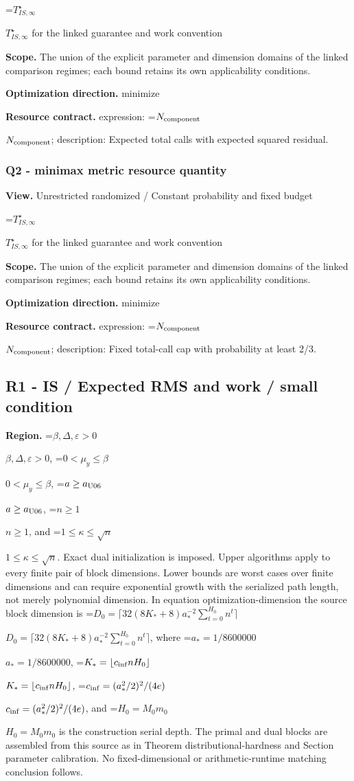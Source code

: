 \documentclass[10pt,a4paper]{article}
\newcommand{\AtlasMath}[1]{\par\begingroup\centering\setbox0=\hbox{$\displaystyle #1$}\ifdim\wd0>1.4\linewidth\typeout{ATLAS WIDE FORMULA: \the\wd0}\fi\ifdim\wd0>\linewidth\resizebox{\linewidth}{!}{\box0}\else\box0\fi\par\endgroup}
\newcommand{\AtlasInlineMath}[1]{\begingroup\setbox0=\hbox{$#1$}\ifdim\wd0>.4\linewidth\endgroup\AtlasMath{#1}\else\endgroup$#1$\fi}
\begin{document}
\AtlasInlineMath{T^\star_{IS,\infty}} for the linked guarantee and work convention



\textbf{Scope.} The union of the explicit parameter and dimension domains of the linked comparison regimes; each bound retains its own applicability conditions.



\textbf{Optimization direction.} minimize



\textbf{Resource contract.} expression: \AtlasInlineMath{N_{\rm component}}; description: Expected total calls with expected squared residual.



\subsubsection{Q2 - minimax metric resource quantity}


\textbf{View.} Unrestricted randomized / Constant probability and fixed budget



\AtlasInlineMath{T^\star_{IS,\infty}} for the linked guarantee and work convention



\textbf{Scope.} The union of the explicit parameter and dimension domains of the linked comparison regimes; each bound retains its own applicability conditions.



\textbf{Optimization direction.} minimize



\textbf{Resource contract.} expression: \AtlasInlineMath{N_{\rm component}}; description: Fixed total-call cap with probability at least 2/3.



\subsection{R1 - IS / Expected RMS and work / small condition}


\textbf{Region.} \AtlasInlineMath{\beta,\Delta,\varepsilon>0}, \AtlasInlineMath{0<\mu_y\le\beta}, \AtlasInlineMath{a\ge a_{\rm U06}}, \AtlasInlineMath{n\ge1}, and \AtlasInlineMath{1\le\kappa\le\sqrt n}. Exact dual initialization is imposed. Upper algorithms apply to every finite pair of block dimensions. Lower bounds are worst cases over finite dimensions and can require exponential growth with the serialized path length, not merely polynomial dimension. In equation optimization-dimension the source block dimension is \AtlasInlineMath{D_0=\lceil32(8K_*+8)a_*^{-2}\sum_{t=0}^{H_0}n^t\rceil}, where \AtlasInlineMath{a_*=1/8600000}, \AtlasInlineMath{K_*=\lfloor c_{\rm inf}nH_0\rfloor}, \AtlasInlineMath{c_{\rm inf}=(a_*^2/2)^2/(4e)}, and \AtlasInlineMath{H_0=M_0m_0} is the construction serial depth. The primal and dual blocks are assembled from this source as in Theorem distributional-hardness and Section parameter calibration. No fixed-dimensional or arithmetic-runtime matching conclusion follows.
\end{document}
